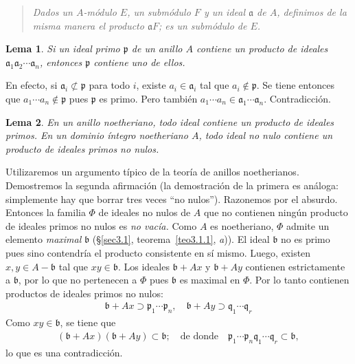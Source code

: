 \documentclass[bibtotoc,leqno,spanish]{amsbook}
\newcommand{\idl}[1]{\mathfrak{#1}}
\numberwithin{equation}{section}
\newenvironment{comm}%
	{\begin{quotation}\itshape\Small}
	{\end{quotation}}
\theoremstyle{note}
\theoremstyle{note}
\newtheorem{lemma}{Lema}
\theoremstyle{rem}
\numberwithin{theorem}{section}
\numberwithin{proposition}{section}
\numberwithin{definition}{section}
\numberwithin{lemma}{section}
\numberwithin{corollary}{section}
\numberwithin{example}{section}
\numberwithin{footnote}{section}%
\begin{document}
\begin{comm}
Dados un $A$-m\'odulo $E$, un subm\'odulo $F$ y un ideal $\idl{a}$ de $A$, definimos
de la misma manera el producto $\idl{a}F$; es un subm\'odulo de $E$.
\end{comm}

\begin{lemma}\label{lem3.3.2}
Si un ideal primo $\idl{p}$ de un anillo $A$ contiene un producto de ideales
$\idl{a}_{1}\idl{a}_{2}\cdots\idl{a}_{n}$, entonces $\idl{p}$ contiene uno de ellos.
\end{lemma}

En efecto, si $\idl{a}_{i}\not\subset\idl{p}$ para todo $i$, existe $a_{i}\in\idl{a}_{i}$ tal que
$a_{i}\notin\idl{p}$. Se tiene entonces que $a_{1}\cdots a_{n}\notin\idl{p}$ pues $\idl{p}$
es primo. Pero tambi\'en $a_{1}\cdots a_{n}\in\idl{a}_{1}\cdots\idl{a}_{n}$. Contradicci\'on.

\begin{lemma}\label{lem3.3.3}
En un anillo noetheriano, todo ideal contiene un producto de ideales primos. En un dominio \'integro noetheriano
$A$, todo ideal no nulo contiene un producto de ideales primos no nulos.
\end{lemma}

Utilizaremos un argumento t\'ipico de la teor\'ia de anillos noetherianos. Demostremos la segunda
afirmaci\'on (la demostraci\'on de la primera es an\'aloga: simplemente hay que borrar tres
veces ``no nulos''). Razonemos por el absurdo. Entonces la familia $\Phi$ de ideales no nulos de $A$ que
no contienen ning\'un producto de ideales primos no nulos es {\em no vac\'ia.} Como $A$ es noetheriano,
$\Phi$ admite un elemento {\em maximal} $\idl{b}$ (\S\ref{sec3.1}, teorema~\ref{teo3.1.1}, {\itshape a})).
El ideal $\idl{b}$ no es primo pues
sino contendr\'ia el producto consistente en s\'i mismo. Luego, existen $x, y\in A-\idl{b}$ tal que
$xy\in\idl{b}$. Los ideales $\idl{b}+Ax$ y $\idl{b}+Ay$ contienen estrictamente a $\idl{b}$, por lo que
no pertenecen a $\Phi$ pues $\idl{b}$ es maximal en $\Phi$. Por lo tanto contienen productos de ideales
primos no nulos:
\begin{gather*}
\idl{b}+Ax\supset\idl{p}_{1}\cdots\idl{p}_{n},\quad\idl{b}+Ay\supset\idl{q}_{1}\cdots\idl{q}_{r}
\end{gather*}
Como $xy\in\idl{b}$, se tiene que
\begin{gather*}
(\idl{b}+Ax)(\idl{b}+Ay)\subset\idl{b};\quad\text{de donde}\quad\idl{p}_{1}\cdots\idl{p}_{n}\idl{q}_{1}\cdots
\idl{q}_{r}\subset\idl{b},
\end{gather*}
lo que es una contradicci\'on.
\end{document}

